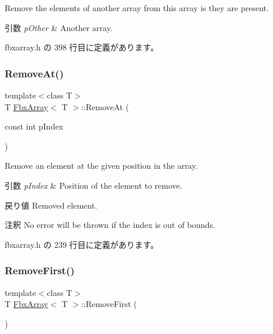 Remove the elements of another array from this array is they are present. 
\begin{DoxyParams}{引数}
{\em p\+Other} & Another array. \\
\hline
\end{DoxyParams}


 fbxarray.\+h の 398 行目に定義があります。

\mbox{\label{class_fbx_array_a6a4be3173c8ec89179b7cf21687d7d61}} 
\subsubsection{\texorpdfstring{Remove\+At()}{RemoveAt()}}
{\footnotesize\ttfamily template$<$class T$>$ \\
T \hyperlink{class_fbx_array}{Fbx\+Array}$<$ T $>$\+::Remove\+At (\begin{DoxyParamCaption}\item[{const int}]{p\+Index }\end{DoxyParamCaption})\hspace{0.3cm}{\ttfamily [inline]}}

Remove an element at the given position in the array. 
\begin{DoxyParams}{引数}
{\em p\+Index} & Position of the element to remove. \\
\hline
\end{DoxyParams}
\begin{DoxyReturn}{戻り値}
Removed element. 
\end{DoxyReturn}
\begin{DoxyRemark}{注釈}
No error will be thrown if the index is out of bounds. 
\end{DoxyRemark}


 fbxarray.\+h の 239 行目に定義があります。

\mbox{\label{class_fbx_array_ade8f6c6fbc62584870d16ffd1e011559}} 
\subsubsection{\texorpdfstring{Remove\+First()}{RemoveFirst()}}
{\footnotesize\ttfamily template$<$class T$>$ \\
T \hyperlink{class_fbx_array}{Fbx\+Array}$<$ T $>$\+::Remove\+First (\begin{DoxyParamCaption}{ }\end{DoxyParamCaption})\hspace{0.3cm}{\ttfamily [inline]}}

